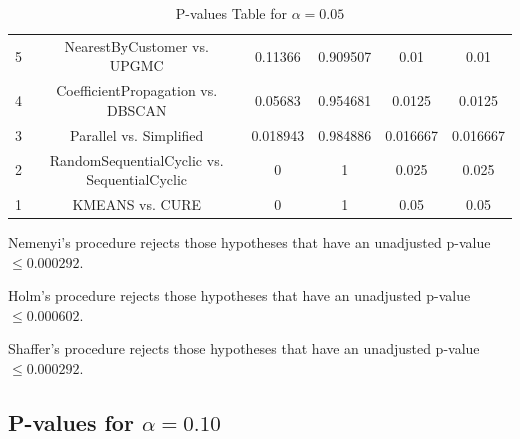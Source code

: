 \documentclass[a4paper,10pt]{article}
\begin{document}
\begin{landscape}
\begin{table}[!htp]
\begin{tabular}{cccccc}
5&NearestByCustomer vs. UPGMC&0.11366&0.909507&0.01&0.01\\
4&CoefficientPropagation vs. DBSCAN&0.05683&0.954681&0.0125&0.0125\\
3&Parallel vs. Simplified&0.018943&0.984886&0.016667&0.016667\\
2&RandomSequentialCyclic vs. SequentialCyclic&0&1&0.025&0.025\\
1&KMEANS vs. CURE&0&1&0.05&0.05\\
\hline
\end{tabular}
\caption{P-values Table for $\alpha=0.05$}
\end{table}Nemenyi's procedure rejects those hypotheses that have an unadjusted p-value $\le0.000292$.

Holm's procedure rejects those hypotheses that have an unadjusted p-value $\le0.000602$.

Shaffer's procedure rejects those hypotheses that have an unadjusted p-value $\le0.000292$.

\pagebreak

\subsection{P-values for $\alpha=0.10$}


\end{landscape}
\end{document}

